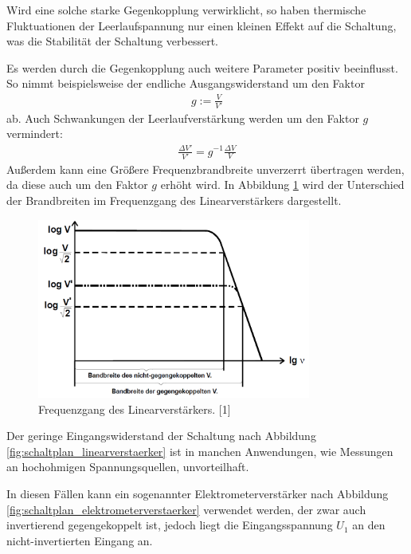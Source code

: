 \documentclass[]{scrartcl}
\begin{document}
Wird eine solche starke Gegenkopplung verwirklicht, so haben thermische Fluktuationen der Leerlaufspannung nur einen kleinen Effekt auf die Schaltung, was die Stabilität der Schaltung verbessert.

Es werden durch die Gegenkopplung auch weitere Parameter positiv beeinflusst. So nimmt beispielsweise der endliche Ausgangswiderstand um den Faktor
\begin{align}
g:=\frac{V}{V'}
\end{align}
ab. Auch Schwankungen der Leerlaufverstärkung werden um den Faktor $g$ vermindert:
\begin{align}
\frac{\Delta V'}{V'}=g^{-1}\frac{\Delta V}{V}
\end{align}
Außerdem kann eine Größere Frequenzbrandbreite unverzerrt übertragen werden, da diese auch um den Faktor $g$ erhöht wird. In Abbildung \ref{fig:frequenzgang_operationsverstaerker} wird der Unterschied der Brandbreiten im Frequenzgang des Linearverstärkers dargestellt.
\begin{figure}[H]
\centering
\includegraphics[width=9cm]{images/frequenzgang_operationsverstaerker.png}
\caption{Frequenzgang des Linearverstärkers. [1]}
\label{fig:frequenzgang_operationsverstaerker}
\end{figure}

Der geringe Eingangswiderstand der Schaltung nach Abbildung \ref{fig:schaltplan_linearverstaerker} ist in manchen Anwendungen, wie Messungen an hochohmigen Spannungsquellen, unvorteilhaft.

In diesen Fällen kann ein sogenannter Elektrometerverstärker nach Abbildung \ref{fig:schaltplan_elektrometerverstaerker} verwendet werden, der zwar auch invertierend gegengekoppelt ist, jedoch liegt die Eingangsspannung $U_1$ an den nicht-invertierten Eingang an. 
\end{document}

